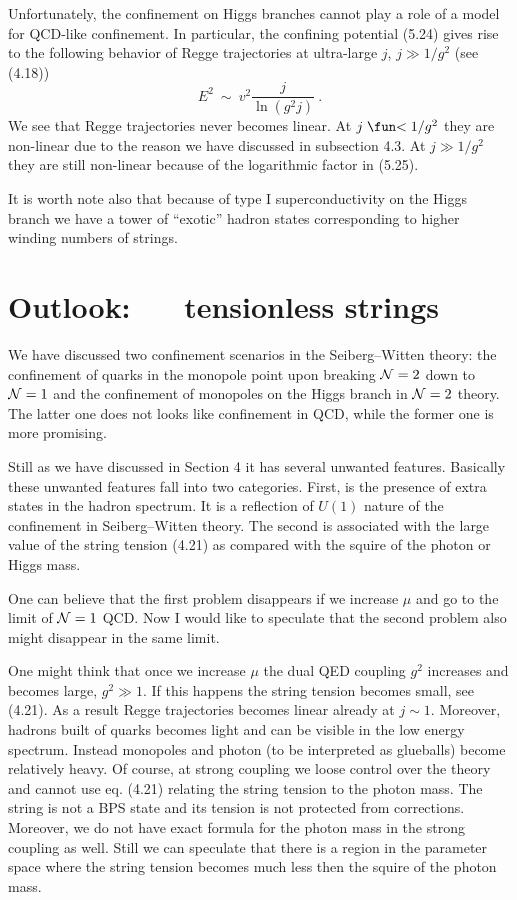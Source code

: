 \documentclass[a4paper,12pt]{article}
\def\la{\mathrel{\mathpalette\fun <}}
\def\fun#1#2{\lower3.6pt\vbox{\baselineskip0pt\lineskip.9pt
\ialign{$\mathsurround=0pt#1\hfil##\hfil$\crcr#2\crcr\sim\crcr}}}
\begin{document}
Unfortunately, the confinement on Higgs branches cannot play a
role of a model for QCD-like confinement. In particular, the
confining potential (5.24) gives rise to the following behavior
of Regge trajectories at ultra-large $j$, $j\gg1/g^2$ (see
(4.18))
\begin{equation}
E^2\ \sim\ v^2\frac j{\ln(g^2j)}\ .
\end{equation}
We see that Regge trajectories never becomes linear. At
$j\la1/g^2$ they are non-linear due to the reason we have
discussed in subsection 4.3. At $j\gg1/g^2$ they are still
non-linear because of the logarithmic factor in (5.25).

It is worth note also that because of type I superconductivity 
on the Higgs branch we
have a tower of ``exotic'' hadron states corresponding to higher
winding numbers of strings. 

\section{Outlook: ~~ tensionless strings}
\setcounter{equation}{0}



We have discussed two confinement scenarios in the
Seiberg--Witten theory: the confinement of quarks in the monopole
point upon breaking ${\cal N}=2$ down to ${\cal N}=1$ and the confinement of
monopoles on the Higgs branch in ${\cal N}=2$ theory. The latter one
does not looks like confinement in QCD, while the former one is
more promising.

Still as we have discussed in Section 4 it has several unwanted
features. Basically these unwanted features fall into two
categories. First, is the presence  of extra states in the
hadron spectrum. It is a reflection of $U(1)$ nature of the
confinement in Seiberg--Witten theory. The second is associated
with the large value of the string tension (4.21) as compared
with the squire of the photon or Higgs mass.

One can believe that the first problem disappears if we increase
$\mu $ and go to the limit of ${\cal N}=1$ QCD. Now I would like to
speculate that the second problem also might disappear in the
same limit.

One might think that once we increase $\mu $ the dual QED
coupling $g^2$ increases and becomes large, $g^2\gg 1$.
 If this happens the
string tension becomes small, see (4.21). As a result Regge
trajectories becomes linear already at $j\sim1$. Moreover,
hadrons built of quarks becomes light and can be visible in the low
energy spectrum. Instead monopoles and photon (to be interpreted
as glueballs) become relatively heavy. Of course, at strong coupling
we loose control over the theory and cannot use eq. (4.21) relating
the string tension to the photon mass. The string is not a BPS
state and its tension is not protected from corrections. Moreover,
we do not have exact formula for the photon mass in the strong coupling as
well. Still we can speculate that there is a region in the parameter
space where the string tension becomes much less then the 
squire of the photon mass.
\end{document}
